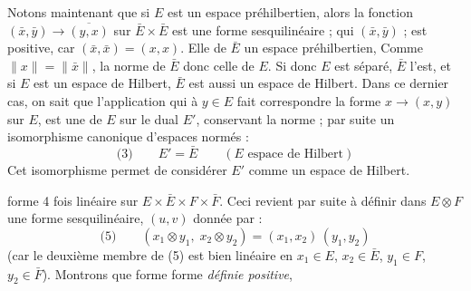 \documentclass[11pt,a4paper]{article}
\begin{document}
Notons maintenant que si $E$ est un espace préhilbertien, alors la fonction $(\bar{x}, \bar{y}) \to \overline{(y,x)}$ sur $\bar{E} \times \bar{E}$ est une forme sesquilinéaire ; qui   $(\bar{x}, \bar{y})$ ;   est \struck{\ill{}} positive, car $(\bar{x}, \bar{x}) = (x, x)$. Elle  de  $\bar{E}$  un espace préhilbertien, Comme   $\|x\| = \|\bar{x}\|$, la norme de $\bar{E}$  donc  celle de $E$. Si donc $E$ est séparé, $\bar{E}$ l'est, et si $E$ est un espace de Hilbert, $\bar{E}$ est aussi un espace de Hilbert. Dans ce dernier cas, on sait que l'application qui à \struck{\ill{}} $y \in E$ fait correspondre la forme $x \to (x,y)$ sur $E$, est une     de $E$ sur le dual $E'$, conservant la norme ; par suite   \struck{\ill{}}  un isomorphisme canonique d'espaces normés :
\[
  \text{(3)}\qquad E' = \bar{E} \qquad (E \text{ espace de Hilbert})
\]
Cet isomorphisme permet de considérer $E'$ comme \struck{\ill{}} \struck{\ill{}} un espace de Hilbert.

forme 4 fois linéaire sur $E \times \bar{E} \times F \times \bar{F}$.  Ceci revient par suite à définir dans $E \otimes F$  une forme sesquilinéaire, \struck{\ill{}}  $(u,v)$ donnée par :
\[
  \text{(5)}\qquad (x_1 \otimes y_1,\; x_2 \otimes y_2) = (x_1, x_2)\,(y_1, y_2)
\]
 (car le deuxième membre de (5) est bien linéaire en $x_1 \in E$, $x_2 \in \bar{E}$, $y_1 \in F$, $y_2 \in \bar{F}$).  Montrons que  forme    forme \emph{définie positive},

 
\end{document}
